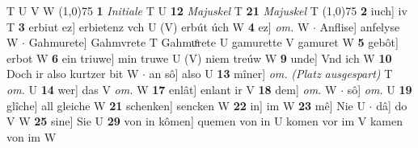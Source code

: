 \documentclass[8pt,a4paper,notitlepage]{article}
\begin{document}
\begin{table}[ht]
\begin{minipage}[t]{0.5\linewidth}
T U V W \newline
\line(1,0){75} \newline
\textbf{1} \textit{Initiale} T U  \textbf{12} \textit{Majuskel} T  \textbf{21} \textit{Majuskel} T  \newline
\line(1,0){75} \newline
\textbf{2} iuch] iv T \textbf{3} erbiut ez] erbietenz vch U (V) erbút úch W \textbf{4} ez] \textit{om.} W  $\cdot$ Anflise] anfelyse W  $\cdot$ Gahmurete] Gahmvrete T Gahmuͦrete U gamurette V gamuret W \textbf{5} gebôt] erbot W \textbf{6} ein triuwe] min truwe U (V) niem treúw W \textbf{9} unde] Vnd ich W \textbf{10} Doch ir also kurtzer bit W  $\cdot$ an sô] also U \textbf{13} mîner] \textit{om.} \textit{(Platz ausgespart)} T \textit{om.} U \textbf{14} wer] das V \textit{om.} W \textbf{17} enlât] enlant ir V \textbf{18} dem] \textit{om.} W  $\cdot$ sô] \textit{om.} U \textbf{19} glîche] all gleiche W \textbf{21} schenken] sencken W \textbf{22} in] im W \textbf{23} mê] Nie U  $\cdot$ dâ] do V W \textbf{25} sine] Sie U \textbf{29} von in kômen] quemen von in U komen vor im V kamen von im W \newline
\end{minipage}
\end{table}
\end{document}
